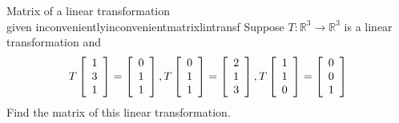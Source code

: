 \begin{example}{Matrix of a linear transformation \\ given inconveniently}{inconvenientmatrixlintransf}
Suppose $T:\mathbb{R}^{3}\rightarrow \mathbb{R}^{3}$ is a linear
transformation and
\begin{equation*}
T\left[
\begin{array}{r}
1 \\
3 \\
1
\end{array}
\right] =\left[
\begin{array}{r}
0 \\
1 \\
1
\end{array}
\right] ,T\left[
\begin{array}{r}
0 \\
1 \\
1
\end{array}
\right] =\left[
\begin{array}{r}
2 \\
1 \\
3
\end{array}
\right] ,T\left[
\begin{array}{r}
1 \\
1 \\
0
\end{array}
\right] =\left[
\begin{array}{r}
0 \\
0 \\
1
\end{array}
\right]
\end{equation*}
Find the matrix of this linear transformation.
\end{example}

